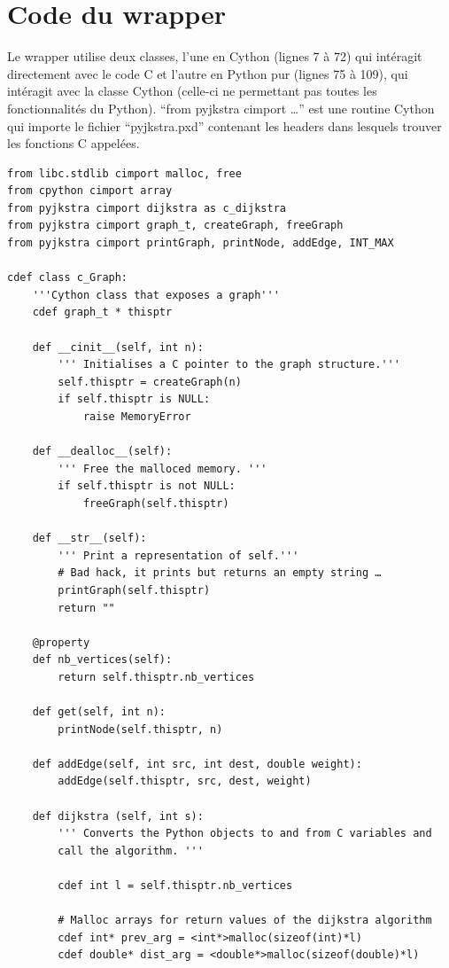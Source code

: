 \documentclass{article}
\begin{document}
\appendix
\section{Code du wrapper}\label{sec:code-du-wrapper}
Le wrapper utilise deux classes, l'une en Cython (lignes 7 à 72) qui
intéragit directement avec le code C et l'autre en Python pur (lignes
75 à 109), qui intéragit avec la classe Cython (celle-ci ne permettant
pas toutes les fonctionnalités du Python). ``from pyjkstra cimport …''
est une routine Cython qui importe le fichier ``pyjkstra.pxd''
contenant les headers dans lesquels trouver les fonctions C appelées.
\begin{verbatim}
from libc.stdlib cimport malloc, free
from cpython cimport array
from pyjkstra cimport dijkstra as c_dijkstra
from pyjkstra cimport graph_t, createGraph, freeGraph
from pyjkstra cimport printGraph, printNode, addEdge, INT_MAX

cdef class c_Graph:
    '''Cython class that exposes a graph'''
    cdef graph_t * thisptr

    def __cinit__(self, int n):
        ''' Initialises a C pointer to the graph structure.'''
        self.thisptr = createGraph(n)
        if self.thisptr is NULL:
            raise MemoryError

    def __dealloc__(self):
        ''' Free the malloced memory. '''        
        if self.thisptr is not NULL:
            freeGraph(self.thisptr)
        
    def __str__(self):
        ''' Print a representation of self.'''
        # Bad hack, it prints but returns an empty string …
        printGraph(self.thisptr)
        return ""

    @property
    def nb_vertices(self):
        return self.thisptr.nb_vertices

    def get(self, int n):
        printNode(self.thisptr, n)

    def addEdge(self, int src, int dest, double weight):
        addEdge(self.thisptr, src, dest, weight)

    def dijkstra (self, int s):
        ''' Converts the Python objects to and from C variables and
        call the algorithm. '''

        cdef int l = self.thisptr.nb_vertices

        # Malloc arrays for return values of the dijkstra algorithm 
        cdef int* prev_arg = <int*>malloc(sizeof(int)*l)
        cdef double* dist_arg = <double*>malloc(sizeof(double)*l)


\end{verbatim}
\end{document}
